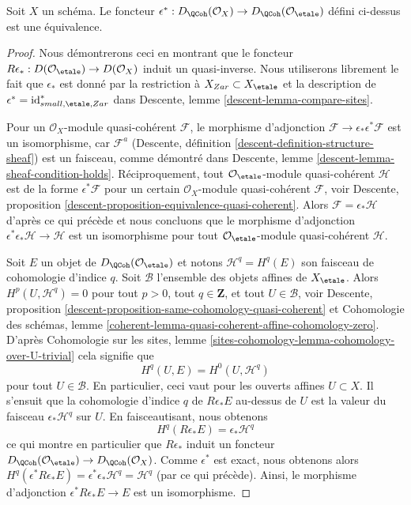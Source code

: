 \begin{lemma}
\label{lemma-derived-quasi-coherent-small-etale-site}
Soit $X$ un schéma. Le foncteur
$\epsilon^* : D_\QCoh(\mathcal{O}_X) \to
D_\QCoh(\mathcal{O}_\etale)$
défini ci-dessus est une équivalence.
\end{lemma}

\begin{proof}
Nous démontrerons ceci en montrant que le foncteur
$R\epsilon_* : D(\mathcal{O}_\etale) \to D(\mathcal{O}_X)$
induit un quasi-inverse. Nous utiliserons librement le fait que $\epsilon_*$
est donné par la restriction à $X_{Zar} \subset X_\etale$ et la description de
$\epsilon^* = \text{id}_{small, \etale, Zar}^*$
dans Descente, lemme \ref{descent-lemma-compare-sites}.

\medskip\noindent
Pour un $\mathcal{O}_X$-module quasi-cohérent $\mathcal{F}$, le morphisme d'adjonction
$\mathcal{F} \to \epsilon_*\epsilon^*\mathcal{F}$ est un isomorphisme, car
$\mathcal{F}^a$
(Descente, définition \ref{descent-definition-structure-sheaf})
est un faisceau, comme démontré dans
Descente, lemme \ref{descent-lemma-sheaf-condition-holds}.
Réciproquement, tout $\mathcal{O}_\etale$-module quasi-cohérent
$\mathcal{H}$ est de la forme $\epsilon^*\mathcal{F}$ pour un certain
$\mathcal{O}_X$-module quasi-cohérent $\mathcal{F}$, voir
Descente, proposition \ref{descent-proposition-equivalence-quasi-coherent}.
Alors $\mathcal{F} = \epsilon_*\mathcal{H}$ d'après ce qui précède et
nous concluons que le morphisme d'adjonction
$\epsilon^*\epsilon_*\mathcal{H} \to \mathcal{H}$ est un isomorphisme pour tout
$\mathcal{O}_\etale$-module quasi-cohérent $\mathcal{H}$.

\medskip\noindent
Soit $E$ un objet de $D_\QCoh(\mathcal{O}_\etale)$
et notons $\mathcal{H}^q = H^q(E)$ son faisceau de cohomologie d'indice $q$.
Soit $\mathcal{B}$ l'ensemble des objets affines de $X_\etale$.
Alors $H^p(U, \mathcal{H}^q) = 0$ pour tout $p > 0$, tout $q \in \mathbf{Z}$,
et tout $U \in \mathcal{B}$, voir
Descente, proposition \ref{descent-proposition-same-cohomology-quasi-coherent}
et
Cohomologie des schémas, lemme
\ref{coherent-lemma-quasi-coherent-affine-cohomology-zero}.
D'après Cohomologie sur les sites, lemme
\ref{sites-cohomology-lemma-cohomology-over-U-trivial}
cela signifie que
$$
H^q(U, E) = H^0(U, \mathcal{H}^q)
$$
pour tout $U \in \mathcal{B}$. En particulier, ceci vaut
pour les ouverts affines $U \subset X$. Il s'ensuit que la cohomologie d'indice $q$ de
$R\epsilon_*E$ au-dessus de $U$ est la valeur du faisceau $\epsilon_*\mathcal{H}^q$
sur $U$. En faisceautisant, nous obtenons
$$
H^q(R\epsilon_*E) = \epsilon_*\mathcal{H}^q
$$
ce qui montre en particulier que $R\epsilon_*$ induit un foncteur
$D_\QCoh(\mathcal{O}_\etale) \to D_\QCoh(\mathcal{O}_X)$.
Comme $\epsilon^*$ est exact, nous obtenons alors
$H^q(\epsilon^*R\epsilon_*E) = \epsilon^*\epsilon_*\mathcal{H}^q =
\mathcal{H}^q$ (par ce qui précède). Ainsi, le morphisme d'adjonction
$\epsilon^*R\epsilon_*E \to E$ est un isomorphisme.


\end{proof}
